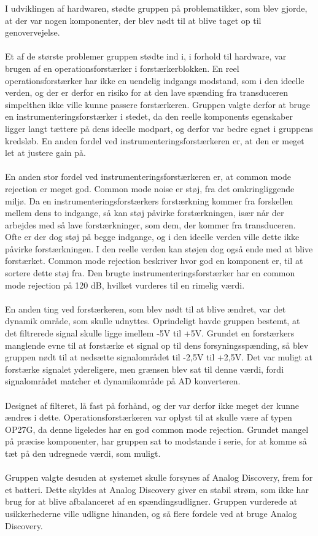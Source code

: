 I udviklingen af hardwaren, stødte gruppen på problematikker, som blev gjorde, at der var nogen komponenter, der blev nødt til at blive taget op til genovervejelse.\\
\\
Et af de største problemer gruppen stødte ind i, i forhold til hardware, var brugen af en operationsforstærker i forstærkerblokken. En reel operationsforstærker har ikke en uendelig indgangs modstand, som i den ideelle verden, og der er derfor en risiko for at den lave spænding fra transduceren simpelthen ikke ville kunne passere forstærkeren. Gruppen valgte derfor at bruge en instrumenteringsforstærker i stedet, da den reelle komponents egenskaber ligger langt tættere på dens ideelle modpart, og derfor var bedre egnet i gruppens kredsløb. En anden fordel ved instrumenteringsforstærkeren er, at den er meget let at justere gain på.\\
\\
En anden stor fordel ved instrumenteringsforstærkeren er, at common mode rejection er meget god. Common mode noise er støj, fra det omkringliggende miljø. Da en instrumenteringsforstærkers forstærkning kommer fra forskellen mellem dens to indgange, så kan støj påvirke forstærkningen, især når der arbejdes med så lave forstærkninger, som dem, der kommer fra transduceren. Ofte er der dog støj på begge indgange, og i den ideelle verden ville dette ikke påvirke forstærkningen. I den reelle verden kan støjen dog også ende med at blive forstærket. Common mode rejection beskriver hvor god en komponent er, til at sortere dette støj fra. Den brugte instrumenteringsforstærker har en common mode rejection på 120 dB, hvilket vurderes til en rimelig værdi. \\
\\
En anden ting ved forstærkeren, som blev nødt til at blive ændret, var det dynamik område, som skulle udnyttes. Oprindeligt havde gruppen bestemt, at det filtrerede signal skulle ligge imellem -5V til +5V. Grundet en forstærkers manglende evne til at forstærke et signal op til dens forsyningsspænding, så blev gruppen nødt til at nedsætte signalområdet til -2,5V til +2,5V. Det var muligt at forstærke signalet ydereligere, men grænsen blev sat til denne værdi, fordi signalområdet matcher et dynamikområde på AD konverteren.\\ 
\\
Designet af filteret, lå fast på forhånd, og der var derfor ikke meget der kunne ændres i dette. Operationsforstærkeren var oplyst til at skulle være af typen OP27G, da denne ligeledes har en god common mode rejection. Grundet mangel på præcise komponenter, har gruppen sat to modstande i serie, for at komme så tæt på den udregnede værdi, som muligt. \\
\\
Gruppen valgte desuden at systemet skulle forsynes af Analog Discovery, frem for et batteri. Dette skyldes at Analog Discovery giver en stabil strøm, som ikke har brug for at blive afbalanceret af en spændingsudligner. Gruppen vurderede at usikkerhederne ville udligne hinanden, og så flere fordele ved at bruge Analog Discovery.\\


